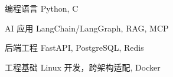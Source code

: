 

\begin{cvskills}

\cvskill
  {编程语言}
  {Python, C}

  \cvskill
    {AI 应用}
    {LangChain/LangGraph, RAG, MCP}

  \cvskill
    {后端工程}
    {FastAPI, PostgreSQL, Redis}

  \cvskill
    {工程基础}
    {Linux 开发，跨架构适配, Docker}

\end{cvskills}
